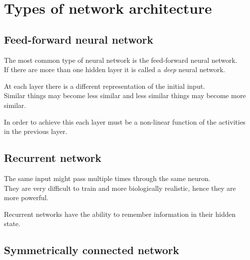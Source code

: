 \documentclass[a4paper]{article}
\begin{document}
\pagebreak


\section{Types of network architecture}

\subsection{Feed-forward neural network}

The most common type of neural network is the feed-forward neural network. \\
If there are more than one hidden layer it is called a \textit{deep} neural network.

\begin{center}
    \begin{neuralnetwork}[height=4]
        \hiddenlayer[count=4, bias=false, title=Hidden\\units] \linklayers{}
        \outputlayer[count=2, title=Output\\units] \linklayers{}
    \end{neuralnetwork}
\end{center}

At each layer there is a different representation of the initial input. \\
Similar things may become less similar and less similar things may become more similar.

In order to achieve this each layer must be a non-linear function of the activities in the previous layer.

\subsection{Recurrent network}

The same input might pass multiple times through the same neuron. \\
They are very difficult to train and more biologically realistic, hence they are more powerful.

Recurrent networks have the ability to remember information in their hidden state.

\subsection{Symmetrically connected network}
\end{document}
